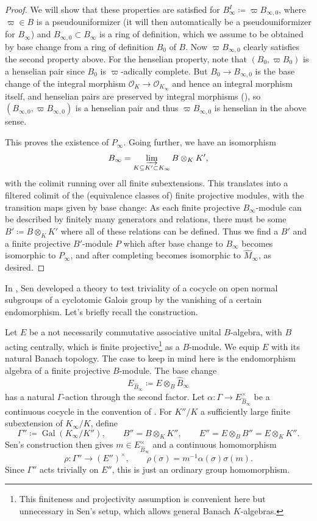 \documentclass[10pt,twoside]{article}
\numberwithin{equation}{section}
\theoremstyle{plain}
\theoremstyle{definition}
\DeclareMathOperator{\Gal}{Gal}
\newcommand{\MCO}{\mathcal{O}}
\begin{document}
\begin{proof}
We will show that these properties are satisfied for \(B^I_\infty\coloneqq \varpi B_{\infty,0}\), where \(\varpi\in B\) is a pseudouniformizer (it will then automatically be a pseudouniformizer for \(B_\infty\)) and \(B_{\infty,0}\subset B_\infty\) is a ring of definition, which we assume to be obtained by base change from a ring of definition \(B_0\) of \(B\). Now \(\varpi B_{\infty,0}\) clearly satisfies the second property above. For the henselian property, note that \((B_0,\varpi B_0)\) is a henselian pair since \(B_0\) is \(\varpi\)-adically complete. But \(B_0\to B_{\infty,0}\) is the base change of the integral morphism \(\MCO_K\to \MCO_{K_\infty}\) and hence an integral morphism itself, and henselian pairs are preserved by integral morphisms (\cite[09XK]{Stacks}), so \((B_{\infty,0},\varpi B_{\infty,0})\) is a henselian pair and thus \(\varpi B_{\infty,0}\) is henselian in the above sense.\par
This proves the existence of \(P_\infty\). Going further, we have an isomorphism
\[B_\infty=\varinjlim_{K\subseteq K'\subset K_\infty} B\otimes_K K',\]
with the colimit running over all finite subextensions. This translates into a filtered colimit of the (equivalence classes of) finite projective modules, with the transition maps given by base change: As each finite projective \(B_\infty\)-module can be described by finitely many generators and relations, there must be some \(B'\coloneqq B\otimes_K K'\) where all of these relations can be defined. Thus we find a \(B'\) and a finite projective \(B'\)-module \(P\) which after base change to \(B_\infty\) becomes isomorphic to \(P_\infty\), and after completing becomes isomorphic to \(\hat M_\infty\), as desired.
\end{proof}



In \cite[\S2.3]{Sen}, Sen developed a theory to test triviality of a cocycle on open normal
subgroups of a cyclotomic Galois group by the vanishing of a certain endomorphism. Let’s briefly recall the construction.\par
Let \(E\) be a not necessarily commutative associative unital \(B\)-algebra, with \(B\) acting centrally, which is finite projective\footnote{This finiteness and projectivity assumption is convenient here but unnecessary in Sen's setup, which allows general Banach \(K\)-algebras.} as a \(B\)-module. We equip \(E\) with its natural Banach topology. The case to keep in mind here is the endomorphism algebra of a finite projective \(B\)-module. The base change
\[
E_{\hat B_\infty}\coloneqq E\otimes_B\hat B_\infty
\]
has a natural \(\Gamma\)-action through the second factor. Let \(\alpha\colon\Gamma\to E_{\hat B_\infty}^\times\) be a continuous cocycle in the convention of . For \(K''/K\) a sufficiently large finite subextension of \(K_\infty/K\), define
\[
\Gamma''\coloneqq\Gal(K_\infty/K''), \qquad B''=B\otimes_K K'',\qquad E''=E\otimes_B B''=E\otimes_K K''.
\]
Sen's construction then gives \(m\in E_{\hat B_\infty}^\times\) and a continuous homomorphism
\[
\rho\colon\Gamma''\longrightarrow(E'')^\times,
\qquad \rho(\sigma)=m^{-1}\alpha(\sigma)\sigma(m).
\]
Since \(\Gamma''\) acts trivially on \(E''\), this is just an ordinary group homomorphism.
\end{document}
